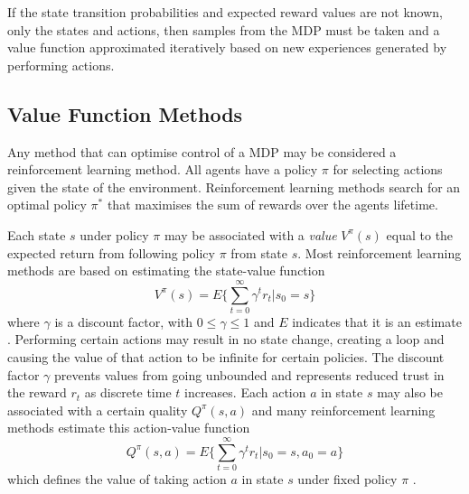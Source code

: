 If the state transition probabilities and expected reward values are not known,
only the states and actions, then samples from the MDP must be taken and a value
function approximated iteratively based on new experiences generated by
performing actions.

\subsection{Value Function Methods}
\label{sec:valuebased}
Any method that can optimise control of a MDP may be considered a reinforcement
learning method.  All agents have a policy $\pi$ for selecting actions given the
state of the environment. Reinforcement learning methods search for an optimal
policy $\pi^*$ that maximises the sum of rewards over the agents lifetime.

Each state $s$ under policy $\pi$ may be associated with a \textit{value}
$V^\pi(s)$ equal to the expected return from following policy $\pi$ from state
$s$.  Most reinforcement learning methods are based on estimating the
state-value function
\begin{equation}
\label{eq:statevalue}
V^\pi(s) = E \Bigg\lbrace \sum^\infty_{t=0} \gamma^t r_t \Bigg\vert s_0 = s
\Bigg\rbrace
\end{equation}
where $\gamma$ is a discount factor, with $0\leq \gamma \leq 1$ and $E$
indicates that it is an estimate \cite{suttonbarto:1998}. Performing certain
actions may result in no state change, creating a loop and causing the value of
that action to be infinite for certain policies. The discount factor $\gamma$
prevents values from going unbounded and represents reduced trust in the reward
$r_t$ as discrete time $t$ increases.  Each action $a$ in state $s$ may also
be associated with a certain quality $Q^\pi(s,a)$ and many reinforcement
learning methods estimate this action-value function
\begin{equation}
\label{eq:actionvalue}
Q^\pi(s,a) = E \Bigg\lbrace \sum^\infty_{t=0} \gamma^t r_t \Bigg\vert s_0 = s,
a_0 = a \Bigg\rbrace
\end{equation}
which defines the value of taking action $a$ in state $s$ under fixed policy
$\pi$ \cite{suttonbarto:1998}.

